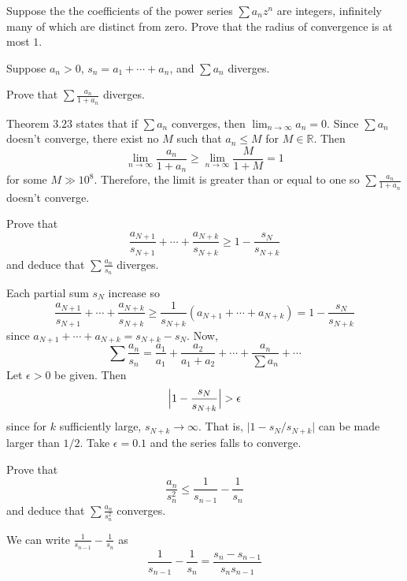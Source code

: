 \begin{exercise}
\begin{exercise}[label = (\alph*)]
  \end{exercise}
\item
  Suppose the the coefficients of the power series \(\sum a_nz^n\) are
  integers, infinitely many of which are distinct from zero.
  Prove that the radius of convergence is at most \(1\).
  \par\smallskip
\item
  Suppose \(a_n > 0\), \(s_n = a_1 + \cdots + a_n\), and \(\sum a_n\) diverges.
  \begin{exercise}[label = (\alph*), ref = \arabic{exercisei} (\alph*)]
  \item
    Prove that \(\sum\frac{a_n}{1 + a_n}\) diverges.
    \par\smallskip
    Theorem \(3.23\) states that if \(\sum a_n\) converges, then
    \(\lim_{n\to\infty}a_n = 0\).
    Since \(\sum a_n\) doesn't converge, there exist no \(M\) such that
    \(a_n\leq M\) for \(M\in\mathbb{R}\).
    Then
    \[
    \lim_{n\to\infty}\frac{a_n}{1 + a_n}\geq
    \lim_{n\to\infty}\frac{M}{1 + M} = 1
    \]
    for some \(M\gg 10^8\).
    Therefore, the limit is greater than or equal to one so
    \(\sum\frac{a_n}{1 + a_n}\) doesn't converge.
  \item
    \label{3.11.b}
    Prove that
    \[
    \frac{a_{N + 1}}{s_{N + 1}} + \cdots + \frac{a_{N + k}}{s_{N + k}}\geq 1
    - \frac{s_N}{s_{N + k}}
    \]
    and deduce that \(\sum\frac{a_n}{s_n}\) diverges.
    \par\smallskip
    Each partial sum \(s_N\) increase so
    \[
    \frac{a_{N + 1}}{s_{N + 1}} + \cdots + \frac{a_{N + k}}{s_{N + k}}\geq
    \frac{1}{s_{N + k}}(a_{N + 1} + \cdots + a_{N + k})  =
    1 - \frac{s_N}{s_{N + k}}
    \]
    since \(a_{N + 1} + \cdots + a_{N + k} = s_{N + k} - s_N\).
    Now,
    \[
    \sum\frac{a_n}{s_n} = \frac{a_1}{a_1} + \frac{a_2}{a_1 + a_2} + \cdots
    + \frac{a_n}{\sum a_n} + \cdots
    \]
    Let \(\epsilon > 0\) be given.
    Then
    \[
    \Bigl\lvert 1 - \frac{s_N}{s_{N + k}}\Bigr\rvert > \epsilon
    \]
    since for \(k\) sufficiently large, \(s_{N + k}\to\infty\).
    That is, \(\lvert 1 - s_N/s_{N + k}\rvert\) can be made larger than
    \(1/2\).
    Take \(\epsilon = 0.1\) and the series falls to converge.
  \item
    Prove that
    \[
    \frac{a_n}{s_n^2}\leq\frac{1}{s_{n - 1}} - \frac{1}{s_n}
    \]
    and deduce that \(\sum\frac{a_n}{s_n^2}\) converges.
    \par\smallskip
    We can write \(\frac{1}{s_{n - 1}} - \frac{1}{s_n}\) as
    \[
    \frac{1}{s_{n - 1}} - \frac{1}{s_n} = \frac{s_n - s_{n - 1}}{s_ns_{n - 1}}
\]
\end{exercise}
\end{exercise}
